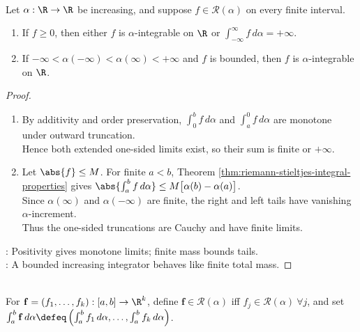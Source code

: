 \begin{theorem} \label{thm:improper-riemann-stieltjes-nonnegative-bounded-mass} \\
Let $\alpha:\R\to\R$ be increasing, and suppose $f\in\mathcal{R}(\alpha)$ on every finite interval.
\begin{enumerate}[label=(\roman*)]
\setlength{\itemsep}{0pt}
\item If $f\geq0$, then either $f$ is $\alpha$-integrable on $\R$ or $\int_{-\infty}^{\infty}f\,d\alpha=+\infty$.
\item If $-\infty<\alpha(-\infty)<\alpha(\infty)<+\infty$ and $f$ is bounded, then $f$ is $\alpha$-integrable on $\R$.
\end{enumerate}
\begin{proof}
\begin{enumerate}[label=(\roman*)]
\setlength{\itemsep}{0pt}
\item
By additivity and order preservation, $\int_0^b f\,d\alpha$ and $\int_a^0 f\,d\alpha$ are monotone under outward truncation.\\
Hence both extended one-sided limits exist, so their sum is finite or $+\infty$.
\item
Let $\abs{f}\leq M$. For finite $a<b$, Theorem \ref{thm:riemann-stieltjes-integral-properties} gives $\abs{\int_a^b f\,d\alpha}\leq M\bigl[\alpha(b)-\alpha(a)\bigr]$.\\
Since $\alpha(\infty)$ and $\alpha(-\infty)$ are finite, the right and left tails have vanishing $\alpha$-increment.\\
Thus the one-sided truncations are Cauchy and have finite limits.
\end{enumerate}
: Positivity gives monotone limits; finite mass bounds tails.\\
: A bounded increasing integrator behaves like finite total mass.
\end{proof}
\end{theorem}

\begin{definition} \label{def:vector-valued-riemann-stieltjes-integral} \\
For $\mathbf{f}=(f_1,\ldots,f_k):[a,b]\to\R^k$, define $\mathbf{f}\in\mathcal{R}(\alpha)$ iff $f_j\in\mathcal{R}(\alpha) \ \forall j$, and set $\int_a^b \mathbf{f}\,d\alpha \defeq \left(\int_a^b f_1\,d\alpha,\ldots,\int_a^b f_k\,d\alpha\right)$.
\end{definition}

